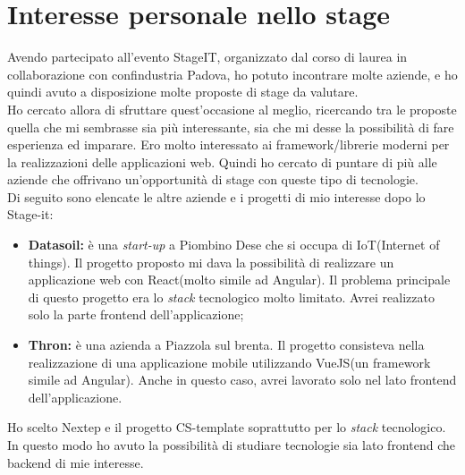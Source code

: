 \section{Interesse personale nello stage}

Avendo partecipato all’evento StageIT, organizzato dal corso di laurea in collaborazione
con confindustria Padova, ho potuto incontrare molte aziende, e ho quindi avuto a
disposizione molte proposte di stage da valutare.
\\

Ho cercato allora di sfruttare quest’occasione al meglio, ricercando tra le proposte
quella che mi sembrasse sia più interessante, sia che mi desse la possibilità di fare
esperienza ed imparare. Ero molto interessato ai framework/librerie moderni per la realizzazioni delle applicazioni web. Quindi ho cercato di puntare di più alle aziende che offrivano un'opportunità di stage con queste tipo di tecnologie. 
\\

Di seguito sono elencate le altre aziende e i progetti di mio interesse dopo lo Stage-it:
\begin{itemize}
	\item \textbf{Datasoil:} è una \emph{start-up} a Piombino Dese che si occupa di IoT(Internet of things). Il progetto proposto mi dava la possibilità di realizzare un applicazione web con React(molto simile ad Angular). Il problema principale di questo progetto era lo \emph{stack} tecnologico molto limitato. Avrei realizzato solo la parte frontend dell'applicazione;
	\item \textbf{Thron:} è una azienda a Piazzola sul brenta. Il progetto consisteva nella realizzazione di una applicazione mobile utilizzando VueJS(un framework simile ad Angular). Anche in questo caso, avrei lavorato solo nel lato frontend dell'applicazione. 
\end{itemize}
Ho scelto Nextep e il progetto CS-template soprattutto per lo \emph{stack} tecnologico. In questo modo ho avuto la possibilità di studiare tecnologie sia lato frontend che backend di mie interesse. 


